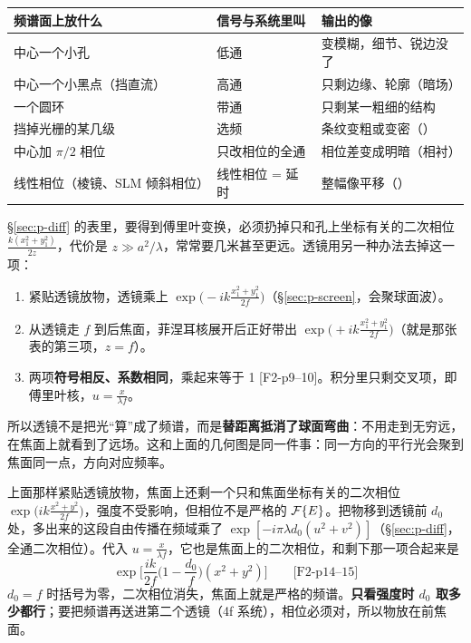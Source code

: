 \begin{center}\small\renewcommand{\arraystretch}{1.3}
\begin{tabular}{@{}P{4.4cm}P{3.6cm}P{7.2cm}@{}}
\toprule
频谱面上放什么 & 信号与系统里叫 & 输出的像\\ \midrule
中心一个小孔 & 低通 & 变模糊，细节、锐边没了\\
中心一个小黑点（挡直流） & 高通 & 只剩边缘、轮廓（暗场）\\
一个圆环 & 带通 & 只剩某一粗细的结构\\
挡掉光栅的某几级 & 选频 & 条纹变粗或变密（\pageref{sec:gratingfilter}）\\
中心加 $\pi/2$ 相位 & 只改相位的全通 & 相位差变成明暗（相衬）\\
线性相位（棱镜、SLM 倾斜相位） & 线性相位 = 延时 & 整幅像平移（\pageref{sec:linphase}）\\
\bottomrule
\end{tabular}
\end{center}

\label{sec:p-lensftwhy}
§\ref{sec:p-diff} 的表里，要得到傅里叶变换，必须扔掉只和孔上坐标有关的二次相位 $\frac{k(x_1^2+y_1^2)}{2z}$，代价是 $z\gg a^2/\lambda$，常常要几米甚至更远。透镜用另一种办法去掉这一项：
\begin{enumerate}
\item 紧贴透镜放物，透镜乘上 $\exp\!\big(-ik\frac{x_1^2+y_1^2}{2f}\big)$（§\ref{sec:p-screen}，会聚球面波）。
\item 从透镜走 $f$ 到后焦面，菲涅耳核展开后正好带出 $\exp\!\big(+ik\frac{x_1^2+y_1^2}{2f}\big)$（就是那张表的第三项，$z=f$）。
\item 两项\textbf{符号相反、系数相同}，乘起来等于 1 [F2-p9–10]。积分里只剩交叉项，即傅里叶核，$u=\frac{x}{\lambda f}$。
\end{enumerate}
所以透镜不是把光“算”成了频谱，而是\textbf{替距离抵消了球面弯曲}：不用走到无穷远，在焦面上就看到了远场。这和上面的几何图是同一件事：同一方向的平行光会聚到焦面同一点，方向对应频率。

上面那样紧贴透镜放物，焦面上还剩一个只和焦面坐标有关的二次相位 $\exp\!\big(ik\frac{x^2+y^2}{2f}\big)$，强度不受影响，但相位不是严格的 $\mathcal{F}\{E\}$。把物移到透镜前 $d_0$ 处，多出来的这段自由传播在频域乘了 $\exp[-i\pi\lambda d_0(u^2+v^2)]$（§\ref{sec:p-diff}，全通二次相位）。代入 $u=\frac{x}{\lambda f}$，它也是焦面上的二次相位，和剩下那一项合起来是
\[
\exp\!\Big[\frac{ik}{2f}\Big(1-\frac{d_0}{f}\Big)(x^2+y^2)\Big]\qquad\text{[F2-p14–15]}
\]
$d_0=f$ 时括号为零，二次相位消失，焦面上就是严格的频谱。\textbf{只看强度时 $d_0$ 取多少都行}；要把频谱再送进第二个透镜（4f 系统），相位必须对，所以物放在前焦面。


